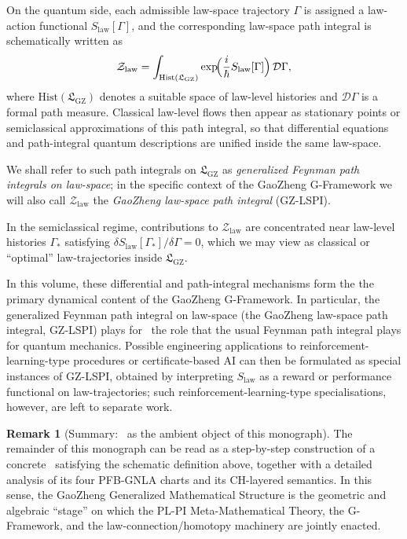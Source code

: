 \documentclass[11pt]{book}
\theoremstyle{plain}
\theoremstyle{definition}
\newtheorem{remark}[theorem]{Remark}
\newcommand{\GFramework}{\text{G-Framework}} \newcommand{\GAlgebra}{\text{G-Algebra}}
\newcommand{\GZLS}{\ensuremath{\mathfrak{L}_{\mathrm{GZ}}}}       \newcommand{\GZLT}{\ensuremath{M_{!w}}}                           \newcommand{\GZLOC}{\ensuremath{A_M}}                             \newcommand{\GZLCurv}{\ensuremath{\mathcal{F}_{\mathrm{law}}}}
\begin{document}
On the quantum side, each admissible law-space trajectory $\Gamma$ is
assigned a law-action functional $S_{\mathrm{law}}[\Gamma]$, and the
corresponding law-space path integral is schematically written as
\[
  \mathcal{Z}_{\mathrm{law}}
  = \int_{\mathrm{Hist}(\GZLS)}
    \exp\!\Bigl(\frac{i}{\hbar}S_{\mathrm{law}}[\Gamma]\Bigr)\,
    \mathcal{D}\Gamma,
\]
where $\mathrm{Hist}(\GZLS)$ denotes a suitable space of law-level
histories and $\mathcal{D}\Gamma$ is a formal path measure. Classical
law-level flows then appear as stationary points or semiclassical
approximations of this path integral, so that differential equations and
path-integral quantum descriptions are unified inside the same
law-space.

We shall refer to such path integrals on $\GZLS$ as \emph{generalized
Feynman path integrals on law-space}; in the specific context of the
GaoZheng G-Framework we will also call $\mathcal{Z}_{\mathrm{law}}$ the
\emph{GaoZheng law-space path integral} (GZ-LSPI).


In the semiclassical regime, contributions to $\mathcal{Z}_{\mathrm{law}}$
are concentrated near law-level histories $\Gamma_*$ satisfying
$\delta S_{\mathrm{law}}[\Gamma_*]/\delta\Gamma = 0$, which we may view
as classical or ``optimal'' law-trajectories inside \GZLS.


In this volume, these differential and path-integral mechanisms form the
the primary dynamical content of the GaoZheng G-Framework. In
particular, the generalized Feynman path integral on law-space (the
GaoZheng law-space path integral, GZ-LSPI) plays for \GFramework\ the
role that the usual Feynman path integral plays for quantum
mechanics. Possible engineering applications to
reinforcement-learning-type procedures or certificate-based AI can then
be formulated as special instances of GZ-LSPI, obtained by interpreting
$S_{\mathrm{law}}$ as a reward or performance functional on
law-trajectories; such reinforcement-learning-type specialisations,
however, are left to separate work.


\begin{remark}[Summary: \GZGMS\ as the ambient object of this monograph]
  The remainder of this monograph can be read as a step-by-step
  construction of a concrete \GZGMS\ satisfying the schematic definition
  above, together with a detailed analysis of its four PFB-GNLA charts
  and its CH-layered semantics. In this sense, the GaoZheng Generalized
  Mathematical Structure is the geometric and algebraic “stage” on
  which the PL-PI Meta-Mathematical Theory, the G-Framework, and the
  law-connection/homotopy machinery are jointly enacted.
\end{remark}
\end{document}
